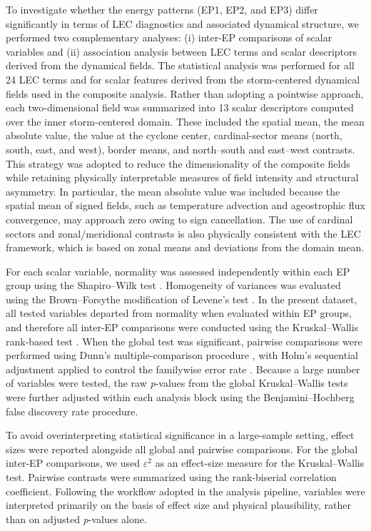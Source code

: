 \documentclass[pdflatex,sn-chicago]{sn-jnl}%
\theoremstyle{plain}
\theoremstyle{definition}
\theoremstyle{remark}
\theoremstyle{definition}
\begin{document}
To investigate whether the energy patterns (EP1, EP2, and EP3) differ significantly in terms of LEC diagnostics and associated dynamical structure, we performed two complementary analyses: (i) inter-EP comparisons of scalar variables and (ii) association analysis between LEC terms and scalar descriptors derived from the dynamical fields. The statistical analysis was performed for all 24 LEC terms and for scalar features derived from the storm-centered dynamical fields used in the composite analysis. Rather than adopting a pointwise approach, each two-dimensional field was summarized into 13 scalar descriptors computed over the inner storm-centered domain. These included the spatial mean, the mean absolute value, the value at the cyclone center, cardinal-sector means (north, south, east, and west), border means, and north--south and east--west contrasts. This strategy was adopted to reduce the dimensionality of the composite fields while retaining physically interpretable measures of field intensity and structural asymmetry. In particular, the mean absolute value was included because the spatial mean of signed fields, such as temperature advection and ageostrophic flux convergence, may approach zero owing to sign cancellation. The use of cardinal sectors and zonal/meridional contrasts is also physically consistent with the LEC framework, which is based on zonal means and deviations from the domain mean.

For each scalar variable, normality was assessed independently within each EP group using the Shapiro--Wilk test \citep{shapiro1965analysis}. Homogeneity of variances was evaluated using the Brown--Forsythe modification of Levene's test \citep{brown1974robust}. In the present dataset, all tested variables departed from normality when evaluated within EP groups, and therefore all inter-EP comparisons were conducted using the Kruskal--Wallis rank-based test \citep{kruskal1952use}. When the global test was significant, pairwise comparisons were performed using Dunn's multiple-comparison procedure \citep{dunn1964multiple}, with Holm's sequential adjustment applied to control the familywise error rate \citep{holm1979simple}. Because a large number of variables were tested, the raw \emph{p}-values from the global Kruskal--Wallis tests were further adjusted within each analysis block using the Benjamini--Hochberg false discovery rate procedure.

To avoid overinterpreting statistical significance in a large-sample setting, effect sizes were reported alongside all global and pairwise comparisons. For the global inter-EP comparisons, we used \(\varepsilon^2\) as an effect-size measure for the Kruskal--Wallis test. Pairwise contrasts were summarized using the rank-biserial correlation coefficient. Following the workflow adopted in the analysis pipeline, variables were interpreted primarily on the basis of effect size and physical plausibility, rather than on adjusted \emph{p}-values alone. 
\end{document}
